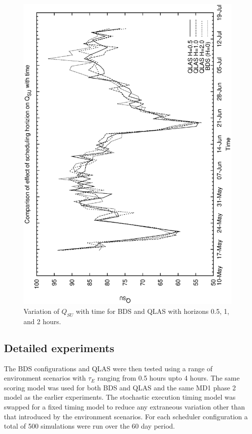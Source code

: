 \begin{figure}[htp]
\begin{center}
  \includegraphics[scale=0.5, angle=-90]{figures/qsa3_su.eps}
  \caption[Variation of $Q_{SU}$ with time for QLAS horizons.]
  {Variation of $Q_{SU}$ with time for BDS and  QLAS with horizons 0.5, 1, and 2 hours.}
\label{fig:ensemble_qlas_su}
\end{center}
\end{figure}


\subsection{Detailed experiments}
The BDS configurations and QLAS were then tested using a range of environment scenarios with $\tau_E$ ranging from 0.5 hours upto 4 hours. The same scoring model was used for both BDS and QLAS and the same MD1 phase 2 model as the earlier experiments. The stochastic execution timing model was swapped for a fixed timing model to reduce any extraneous variation other than that introduced by the environment scenarios. For each scheduler configuration a total of 500 simulations were run over the 60 day period.

